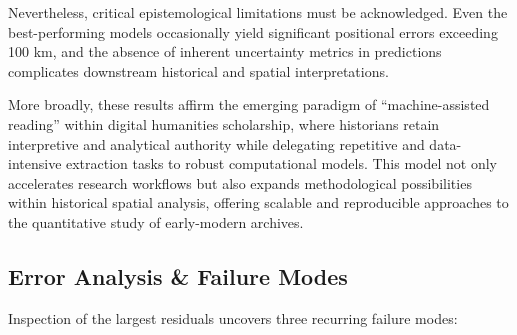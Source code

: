 Nevertheless, critical epistemological limitations must be acknowledged.
Even the best-performing models occasionally yield significant
positional errors exceeding 100 km, and the absence of inherent
uncertainty metrics in predictions complicates downstream historical and
spatial interpretations.

More broadly, these results affirm the emerging paradigm of
``machine-assisted reading'' within digital humanities scholarship,
where historians retain interpretive and analytical authority while
delegating repetitive and data-intensive extraction tasks to robust
computational models. This model not only accelerates research workflows
but also expands methodological possibilities within historical spatial
analysis, offering scalable and reproducible approaches to the
quantitative study of early-modern archives.

\subsection{Error Analysis \& Failure
Modes}\label{error-analysis-failure-modes}

Inspection of the largest residuals uncovers three recurring failure
modes:

